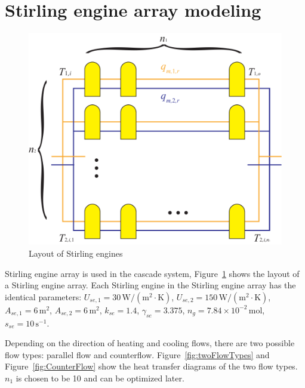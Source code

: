 
\section{Stirling engine array modeling}

\begin{figure}[htbp]
\begin{center}
	\includegraphics[width = 0.6\columnwidth]{fig/stirlingEngineArray.pdf}
	\caption{Layout of Stirling engines}
	\label{fig:Layout of Stirling engines}
\end{center}
\end{figure}
Stirling engine array is used in the cascade system, Figure~\ref{fig:Layout of Stirling engines} shows the layout of a Stirling engine array. Each Stirling engine in the Stirling engine array has the identical parameters: $U_{se,1}=30\,\mathrm{W/(m^2\cdot{}K)}$, $U_{se,2}=150\,\mathrm{W/(m^2\cdot{}K)}$, $A_{se,1}=6\,\mathrm{m^2}$, $A_{se,2}=6\,\mathrm{m^2}$, $k_{se}=1.4$, $\gamma_{se}=3.375$, $n_g=7.84\times10^{-2}\,\mathrm{mol}$, $s_{se}=10\,\mathrm{s^{-1}}$.

Depending on the direction of heating and cooling flows, there are two possible flow types: parallel flow and counterflow. 
Figure~\ref{fig:twoFlowTypes} and 
Figure~\ref{fig:CounterFlow} show the heat transfer diagrams of the two flow types.
 $n_1$ is chosen to be 10 and can be optimized later.

